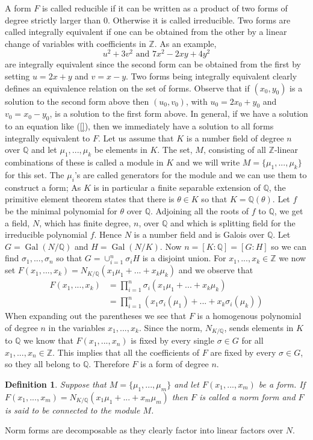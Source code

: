 \documentclass{article}
\DeclareMathOperator{\Gal}{Gal}
\newtheorem{definition}{Definition}[section]
\newcommand{\mbb}[1]{\mathbb{#1}}
\begin{document}
A form $F$ is called reducible if it can be written as a product of two forms of degree strictly larger than 0. Otherwise it is called irreducible. Two forms are called integrally equivalent if one can be obtained from the other by a linear change of variables with coefficients in $\mbb{Z}$. As an example,
\begin{equation*}
    u^2 + 3v^2 \text{ and } 7x^2 - 2xy + 4y^2
\end{equation*}
are integrally equivalent since the second form can be obtained from the first by setting $u = 2x+y$ and $v = x-y$.  Two forms being integrally equivalent clearly defines an equivalence relation on the set of forms. Observe that if $(x_0, y_0)$ is a solution to the second form above then $(u_0, v_0)$, with $u_0 = 2x_0 + y_0$ and $v_0 = x_0 - y_0$, is a solution to the first form above. In general, if we have a solution to an equation like (\ref{}), then we immediately have a solution to all forms integrally equivalent to $F$. Let us assume that $K$ is a number field of degree $n$ over $\mbb Q$ and let $\mu_1, ..., \mu_k$ be elements in $K$. The set, $M$, consisting of all $\mbb{Z}$-linear combinations of these is called a module in $K$ and we will write $M = \{\mu_1, ..., \mu_k\}$ for this set. The $\mu_i$'s are called generators for the module and we can use them to construct a form; As $K$ is in particular a finite separable extension of $\mbb Q$, the primitive element theorem states that there is $\theta \in K$ so that $K = \mbb Q(\theta)$. Let $f$ be the minimal polynomial for $\theta$ over $\mbb Q$. Adjoining all the roots of $f$ to $\mbb Q$, we get a field, $N$, which has finite degree, $n$, over $\mbb Q$ and which is splitting field for the irreducible polynomial $f$. Hence $N$ is a number field and is Galois over $\mbb Q$. Let $G = \Gal(N / \mbb Q)$ and $H = \Gal(N / K)$. Now $n = [K : \mbb Q] = [G : H]$ so we can find $\sigma_1, ..., \sigma_n$ so that
$G = \cup_{i=1}^n \sigma_i H$
is a disjoint union. For $x_1, ..., x_k \in \mbb Z$ we now set $F(x_1, ..., x_k) = N_{K/\mbb Q}(x_1 \mu_1 + ... + x_k \mu_k)$ and we observe that 
\begin{align*}
    F(x_1, ..., x_k) &= \prod_{i = 1}^n \sigma_i(x_1 \mu_1 + ... + x_k \mu_k)\\ 
    &= \prod_{i = 1}^n \left(x_1 \sigma_i(\mu_1) + ... + x_k \sigma_i(\mu_k) \right)
\end{align*}
When expanding out the parentheses we see that $F$ is a homogenous polynomial of degree $n$ in the variables $x_1, ..., x_k$. Since the norm, $N_{K/\mbb Q}$, sends elements in $K$ to $\mbb Q$ we know that $F(x_1, ..., x_n)$ is fixed by every single $\sigma \in G$ for all $x_1, ..., x_n \in \mbb Z$. This implies that all the coefficients of $F$ are fixed by every $\sigma \in G$, so they all belong to $\mbb Q$. Therefore $F$ is a form of degree $n$. 
\begin{definition}
    Suppose that $M = \{\mu_1, ..., \mu_m\}$ and let $F(x_1,...,x_m)$ be a form. If $F(x_1, ..., x_m) = N_{K / \mbb Q}(x_1 \mu_1 + ... + x_m \mu_m)$ then $F$ is called a norm form and $F$ is said to be connected to the module $M$. 
\end{definition}
Norm forms are decomposable as they clearly factor into linear factors over $N$. 
\end{document}
